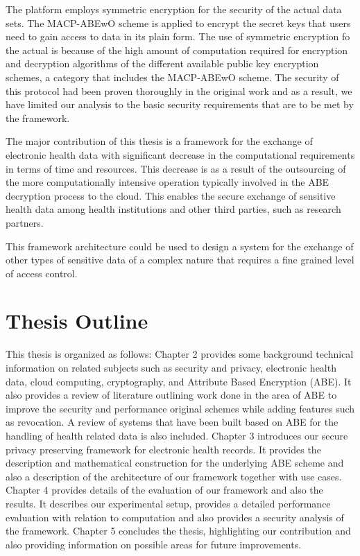 The platform employs symmetric encryption for the security of the actual data sets. The MACP-ABEwO scheme is applied to encrypt the secret keys that users need to gain access to data in its plain form. The use of symmetric encryption fo the actual is because of the high amount of computation required for encryption and decryption algorithms of the different available public key encryption schemes, a category that includes the MACP-ABEwO scheme. The security of this protocol had been proven thoroughly in the original work \cite{Yang2014} and as a result, we have limited our analysis to the basic security requirements that are to be met by the framework.

The major contribution of this thesis is a framework for the exchange of electronic health data with significant decrease in the computational requirements in terms of time and resources. This decrease is as a result of the outsourcing of the more computationally intensive operation typically involved in the ABE decryption process to the cloud. This enables the secure exchange of sensitive health data among health institutions and other third parties, such as research partners.

This framework architecture could be used to design a system for the exchange of other types of sensitive data of a complex nature that requires a fine grained level of access control.


\section{Thesis Outline}

This thesis is organized as follows: Chapter 2 provides some background technical information on related subjects such as security and privacy, electronic health data, cloud computing, cryptography, and Attribute Based Encryption (ABE). It also provides a review of literature outlining work done in the area of ABE to improve the security and performance original schemes while adding features such as revocation. A review of systems that have been built based on ABE for the handling of health related data is also included. Chapter 3 introduces our secure privacy preserving framework for electronic health records. It provides the description and mathematical construction for the underlying ABE scheme and also a description of the architecture of our framework together with use cases. Chapter 4 provides details of the evaluation of our framework and also the results. It describes our experimental setup, provides a detailed performance evaluation with relation to computation and also provides a security analysis of the framework. Chapter 5 concludes the thesis, highlighting our contribution and also providing information on possible areas for future improvements.